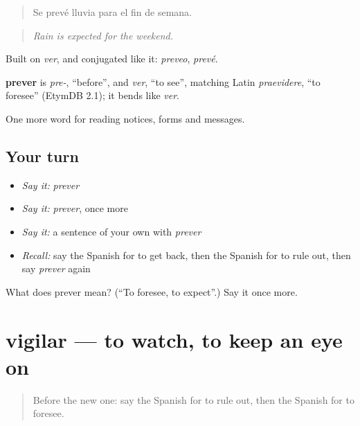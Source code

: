 \begin{quote}
Se prevé lluvia para el fin de semana.
\end{quote}

\begin{quote}
\emph{Rain is expected for the weekend.}
\end{quote}

Built on \emph{ver}, and conjugated like it: \emph{preveo}, \emph{prevé}.

\begin{cousinweb}
\textbf{prever} is \emph{pre-}, \textquotedblleft{}before\textquotedblright{}, and \emph{ver}, \textquotedblleft{}to see\textquotedblright{}, matching Latin \emph{praevidere}, \textquotedblleft{}to foresee\textquotedblright{} (EtymDB 2.1); it bends like \emph{ver}.
\end{cousinweb}

\begin{grammarlens}[title={What you've built}]
One more word for reading notices, forms and messages.
\end{grammarlens}

\subsection*{Your turn}
\begin{itemize}
\raggedright
  \item \emph{Say it:} \emph{prever}
  \item \emph{Say it:} \emph{prever}, once more
  \item \emph{Say it:} a sentence of your own with \emph{prever}
  \item \emph{Recall:} say the Spanish for to get back, then the Spanish for to rule out, then say \emph{prever} again
\end{itemize}

\begin{tcolorbox}[breakable,colback=teal!4,colframe=teal!35!black,title={Before you move on}]
What does prever mean? (\textquotedblleft{}To foresee, to expect\textquotedblright{}.) Say it once more.
\end{tcolorbox}
\section[vigilar]{vigilar — to watch, to keep an eye on}

\label{lesson:ES-C481-vigilar}



\begin{quote}
Before the new one: say the Spanish for to rule out, then the Spanish for to foresee.
\end{quote}

